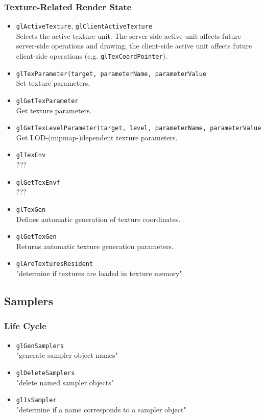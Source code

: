 \documentclass[12pt]{article}
\begin{document}
\subsubsection{Texture-Related Render State}
\begin{itemize}
\item \texttt{glActiveTexture}, \texttt{glClientActiveTexture} \\
	Selects the active texture unit. The server-side active unit affects future server-side operations and drawing; the client-side
	active unit affects future client-side operations (e.g. \texttt{glTexCoordPointer}).
\item \texttt{glTexParameter(target, parameterName, parameterValue} \\
	Set texture parameters.
\item \texttt{glGetTexParameter	} \\
	Get texture parameters.
\item \texttt{glGetTexLevelParameter(target, level, parameterName, parameterValue} \\
	Get LOD-(mipmap-)dependent texture parameters.
\item \texttt{glTexEnv} \\
	???
\item \texttt{glGetTexEnvf} \\
	???
\item \texttt{glTexGen} \\
	Defines automatic generation of texture coordinates.
\item \texttt{glGetTexGen} \\
	Returns automatic texture generation parameters.
\item \texttt{glAreTexturesResident} \\
	"determine if textures are loaded in texture memory"
\end{itemize}



\subsection{Samplers}

\subsubsection{Life Cycle}
\begin{itemize}
\item \texttt{glGenSamplers} \\
	"generate sampler object names"
\item \texttt{glDeleteSamplers} \\
	"delete named sampler objects"
\item \texttt{glIsSampler} \\
	"determine if a name corresponds to a sampler object"
\end{itemize}
\end{document}
